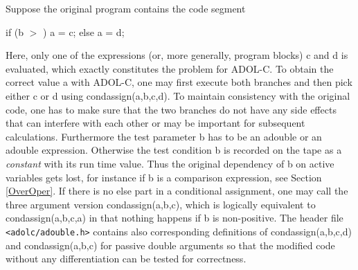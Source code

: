 \documentclass[11pt,twoside]{article}
\begin{document}
Suppose the original program contains the code segment
\begin{center}
{\sf if (b \boldmath $>$ ) a = c; else a = d;}\\
\end{center}
Here, only one of the expressions (or, more generally, program blocks)
{\sf c} and {\sf d} is evaluated, which exactly constitutes the problem
for ADOL-C. To obtain the correct value {\sf a} with ADOL-C, one
may first execute both branches and then pick either {\sf c}
or {\sf d} using 
{\sf condassign(a,b,c,d)}. To maintain
consistency with the original code, one has to make sure
that the two branches do not have any side effects that can
interfere with each other or may be important for subsequent
calculations. Furthermore the test parameter {\sf b} has to be an 
{\sf adouble} or an {\sf adouble} expression. Otherwise the 
test condition {\sf b} is recorded on the tape as a {\em constant} with its
run time value. Thus the original dependency of {\sf b} on 
active variables gets lost, for instance if {\sf b} is a comparison 
expression, see Section \ref{OverOper}. 
If there is no {\sf else} part in a conditional assignment, one may call
the three argument version 
{\sf condassign(a,b,c)}, which 
is logically equivalent to {\sf condassign(a,b,c,a)} in that
nothing happens if {\sf b} is non-positive.  
The header file \verb=<adolc/adouble.h>=
contains also corresponding definitions of
{\sf condassign(a,b,c,d)} 
and {\sf condassign(a,b,c)} for
passive {\sf double} arguments so that the modified code 
without any differentiation can be tested
for correctness. 
%
\end{document}
